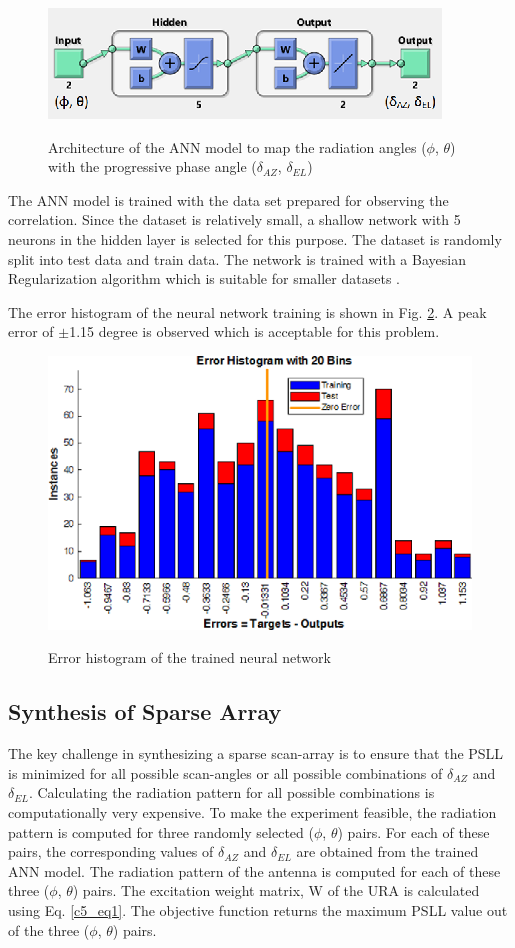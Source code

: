 \begin{figure}
  \centering
  \includegraphics[width=0.6\linewidth]{Fig-naun_4.eps}\\
  \caption{Architecture of the ANN model to map the radiation angles ($\phi$, $\theta$) with the progressive phase angle ($\delta_{AZ}$, $\delta_{EL}$)} \label{fig_5_4}
\end{figure}

The ANN model is trained with the data set prepared for observing the correlation. Since the dataset is relatively small, a shallow network with 5 neurons in the hidden layer is selected for this purpose. The dataset is randomly split into test data and train data. The network is trained with a Bayesian Regularization algorithm which is suitable for smaller datasets \cite{bayesian_regularization, kumaresh_surrgoate}.

The error histogram of the neural network training is shown in Fig. \ref{fig_5_5}. A peak error of $\pm$1.15 degree is observed which is acceptable for this problem.

\begin{figure}
  \centering
  \includegraphics[width=0.5\linewidth]{Fig-naun_5.eps}\\
  \caption{Error histogram of the trained neural network} \label{fig_5_5}
\end{figure}

\subsection{Synthesis of Sparse Array}\label{c5sec_synth}
The key challenge in synthesizing a sparse scan-array is to ensure that the PSLL is minimized for all possible scan-angles or all possible combinations of $\delta_{AZ}$ and $\delta_{EL}$. Calculating the radiation pattern for all possible combinations is computationally very expensive. To make the experiment feasible, the radiation pattern is computed for three randomly selected ($\phi$, $\theta$) pairs. For each of these pairs, the corresponding values of $\delta_{AZ}$ and $\delta_{EL}$ are obtained from the trained ANN model. The radiation pattern of the antenna is computed for each of these three ($\phi$, $\theta$) pairs. The excitation weight matrix, W of the URA is calculated using Eq. \ref{c5_eq1}. The objective function returns the maximum PSLL value out of the three ($\phi$, $\theta$) pairs.

